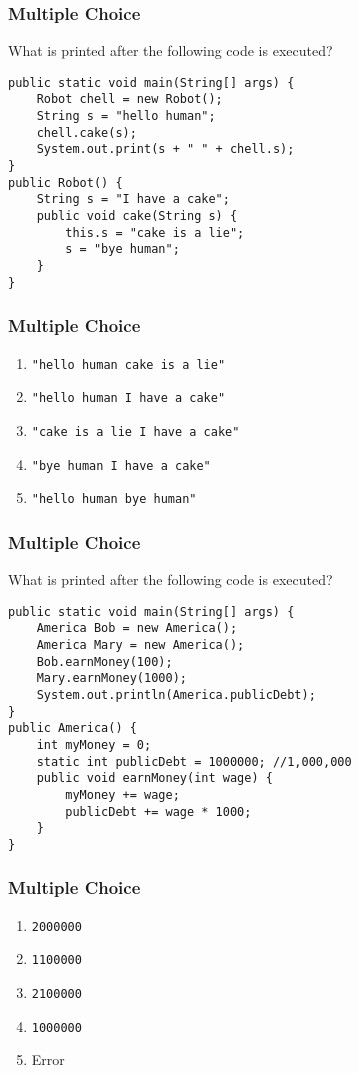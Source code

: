 \documentclass[9pt]{beamer}
\begin{document}
\begin{frame}[fragile]
  \frametitle{Multiple Choice}
  What is printed after the following code is executed?

  \begin{lstlisting}
public static void main(String[] args) {
    Robot chell = new Robot();
    String s = "hello human";
    chell.cake(s);
    System.out.print(s + " " + chell.s);
}
public Robot() {
    String s = "I have a cake";
    public void cake(String s) {
        this.s = "cake is a lie";
        s = "bye human";
    }
}
      \end{lstlisting}
\end{frame}
\begin{frame}[fragile]
  \frametitle{Multiple Choice}
  \begin{enumerate}
    \item
      \alert<2>{{\tt "hello human cake is a lie"}}
    \item
      {\tt "hello human I have a cake"}
    \item
      {\tt "cake is a lie I have a cake"}
    \item
      {\tt "bye human I have a cake"}
    \item
      {\tt "hello human bye human"}
  \end{enumerate}
\end{frame}

\begin{frame}[fragile]
  \frametitle{Multiple Choice}
  What is printed after the following code is executed?

  \begin{lstlisting}
public static void main(String[] args) {
    America Bob = new America();
    America Mary = new America();
    Bob.earnMoney(100);
    Mary.earnMoney(1000);
    System.out.println(America.publicDebt);
}
public America() {
    int myMoney = 0;
    static int publicDebt = 1000000; //1,000,000
    public void earnMoney(int wage) {
        myMoney += wage;
        publicDebt += wage * 1000;
    }
}
      \end{lstlisting}
\end{frame}
\begin{frame}[fragile]
  \frametitle{Multiple Choice}
  \begin{enumerate}
    \item
      {\tt 2000000}
    \item
      {\tt 1100000}
    \item
      \alert<2>{{\tt 2100000}}
    \item
      {\tt 1000000}
    \item
      Error
  \end{enumerate}
\end{frame}
\end{document}
